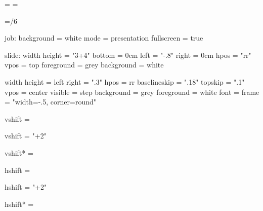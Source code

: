 %
% 
%





\hfuzz=\maxdimen
\vfuzz=\maxdimen %
\lineskiplimit=-1000pt %

\newdimen\squarewidth
\squarewidth=4cm
\newdimen\squaresep
\squaresep=\dimexpr\squarewidth/6


\setparameter job:
  background = white
  mode       = presentation
  fullscreen = true

\setparameter slide:
  width height = "3\squarewidth+4\squaresep"
  bottom       = 0cm
  left         = "-.8\squaresep"
  right        = 0cm
  hpos         = "rr"
  vpos         = top
  foreground   = grey
  background   = white

  width height = \squarewidth
  left right   = ".3\squaresep"
  hpos         = rr
  baselineskip = ".18\squarewidth"
  topskip      = ".1\squarewidth"
  vpos         = center
  visible      = step %
  background   = grey
  foreground   = white
  font         = \mainfont
  frame        = "width=-.5\squaresep, corner=round"

  vshift = \squaresep

  vshift = "\squarewidth+2\squaresep"

  vshift* = \squaresep

  hshift = \squaresep

  hshift = "\squarewidth+2\squaresep"

  hshift* = \squaresep

